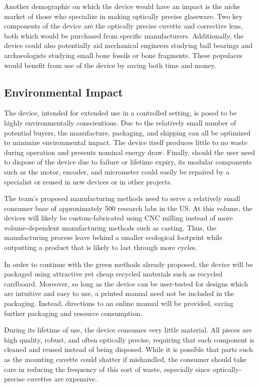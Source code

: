\documentclass{article}
\begin{document}
Another demographic on which the device would have an impact is the
niche market of those who specialize in making optically precise
glassware. Two key components of the device are the optically precise
cuvette and corrective lens, both which would be purchased from
specific manufacturers. Additionally, the device could also
potentially aid mechanical engineers studying ball bearings and
archaeologists studying small bone fossils or bone fragments. These
populaces would benefit from use of the device by saving both time and
money.

\subsection{Environmental Impact}
\label{sec:environment}
 
The device, intended for extended use in a controlled setting, is
posed to be highly environmentally conscientious. Due to the
relatively small number of potential buyers, the manufacture,
packaging, and shipping can all be optimized to minimize environmental
impact. The device itself produces little to no waste during operation
and presents nominal energy draw. Finally, should the user need to
dispose of the device due to failure or lifetime expiry, its modular
components such as the motor, encoder, and micrometer could easily be
repaired by a specialist or reused in new devices or in other
projects.
 
The team's proposed manufacturing methods need to serve a relatively
small consumer base of approximately 500 research labs in the US. At
this volume, the devices will likely be custom-fabricated using CNC
milling instead of more volume-dependent manufacturing methods such as
casting. Thus, the manufacturing process leave behind a smaller
ecological footprint while outputting a product that is likely to last
through more cycles.
 
In order to continue with the green methods already proposed, the
device will be packaged using attractive yet cheap recycled materials
such as recycled cardboard. Moreover, so long as the device can be
user-tested for designs which are intuitive and easy to use, a printed
manual need not be included in the packaging. Instead, directions to
an online manual will be provided, saving further packaging and
resource consumption.
 
During its lifetime of use, the device consumes very little
material. All pieces are high quality, robust, and often optically
precise, requiring that each component is cleaned and reused instead
of being disposed. While it is possible that parts such as the
mounting cuvette could shatter if mishandled, the consumer should take
care in reducing the frequency of this sort of waste, especially since
optically-precise cuvettes are expensive.
 
\end{document}
